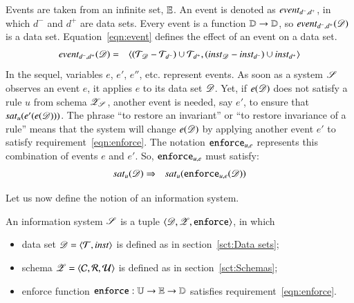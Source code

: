 \documentclass{elsarticle}
\begin{document}
   Events are taken from an infinite set, $\mathbb{E}$.
   An event is denoted as $\text{\it event\/}_{d^-,d^+}$, in which $d^-$ and $d^+$ are data sets.
   Every event is a function $\mathbb{D}\rightarrow\mathbb{D}$, so $\text{\it event\/}_{d^-,d^+}(\mathscr{D})$ is a data set.
   Equation~\ref{eqn:event} defines the effect of an event on a data set.
\begin{eqnarray}
      \text{\it event\/}_{d^-,d^+}(\mathscr{D})&=&\langle(\mathcal{T}_{\mathscr{D}}-\mathcal{T}_{d^-})\cup\mathcal{T}_{d^+},(\mathbin{\text{\it inst\/}}_{\mathscr{D}}-\mathbin{\text{\it inst\/}}_{d^-})\cup\mathbin{\text{\it inst\/}}_{d^+}\rangle
\label{eqn:event}
\end{eqnarray}
   In the sequel, variables $e$, $e'$, $e''$, etc. represent events.
   As soon as a system $\mathscr{S}$ observes an event $e$,
   it applies $e$ to its data set $\mathscr{D}$.
   Yet, if $e(\mathscr{D})$ does not satisfy a rule $u$ from schema $\mathscr{Z}_{\mathscr{S}}$,
   another event is needed, say $e'$, to ensure that $\text{\it sat\/}_{u}(e'(e(\mathscr{D})))$.
   The phrase ``to restore an invariant'' or ``to restore invariance of a rule''
   means that the system will change $e(\mathscr{D})$ by applying another event $e'$ to satisfy requirement~\ref{eqn:enforce}.
   The notation $\mathbin{{\tt enforce}}_{u,e}$ represents this combination of events $e$ and $e'$.
   So, $\mathbin{{\tt enforce}}_{u,e}$ must satisfy:
\begin{eqnarray}
   \text{\it sat\/}_{u}(\mathscr{D})&\Rightarrow&\text{\it sat\/}_{u}({\tt enforce}_{u,e}(\mathscr{D}))
\label{eqn:enforce}
\end{eqnarray}

   Let us now define the notion of an information system.
\begin{definition}
\label{def:information system}
\item An information system $\mathscr{S}$ is a tuple $\langle{\mathscr{D}},{\mathscr{Z}},{\mathbin{{\tt enforce}}}\rangle$, in which
\begin{itemize}
   \item data set $\mathscr{D}=\langle{\mathcal{T}},{\mathbin{\text{\it inst\/}}}\rangle$ is defined as in section~\ref{sct:Data sets};
   \item schema $\mathscr{Z}=\langle{\mathcal{C}},{\mathcal{R}},{\mathcal{U}}\rangle$ is defined as in section~\ref{sct:Schemas};
   \item enforce function ${\mathbin{{\tt enforce}}}:\mathbb{U}\rightarrow\mathbb{E}\rightarrow\mathbb{D}$ satisfies requirement~\ref{eqn:enforce}.
\end{itemize}
\end{definition}
\end{document}
